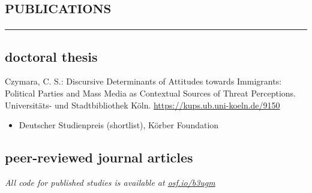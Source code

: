 \documentclass[11pt, a4paper]{article}
\newcommand{\years}[1]{\marginnote{~~#1}}
\begin{document}
\section*{\textsc{publications}}
\vskip-20pt{\noindent\rule{\textwidth}{1pt}}
\subsection*{doctoral thesis}
\years{2018}Czymara, C. S.: Discursive Determinants of Attitudes towards Immigrants: Political Parties and Mass Media as Contextual Sources of Threat Perceptions. Universitäts- und Stadtbibliothek Köln. \href{https://kups.ub.uni-koeln.de/9150}{https://kups.ub.uni-koeln.de/9150}
\begin{itemize}[nolistsep]
	\item Deutscher Studienpreis (shortlist), Körber Foundation
\end{itemize}
\hspace{1em}
\subsection*{peer-reviewed journal articles}
\textit{All code for published studies is available at \href{https://osf.io/b3ugm}{osf.io/b3ugm}}\\
\end{document}
